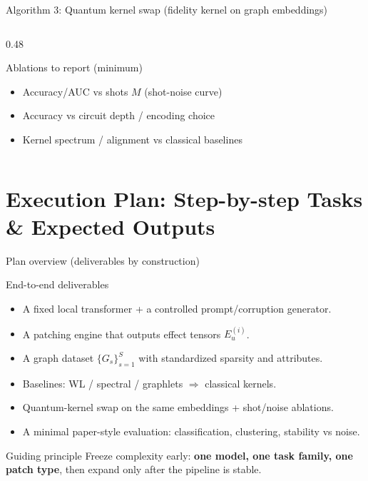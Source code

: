 \documentclass[aspectratio=169,xcolor={dvipsnames}]{beamer}
\renewcommand{\accent}[1]{\textbf{#1}}
\begin{document}
\begin{frame}[fragile, shrink=30]{Algorithm 3: Quantum kernel swap (fidelity kernel on graph embeddings)}
\begin{columns}[T,onlytextwidth]
\begin{column}{0.48\textwidth}
    \vspace{1mm}
    \begin{block}{Ablations to report (minimum)}
    \footnotesize
    \begin{itemize}\setlength\itemsep{2pt}
    \item Accuracy/AUC vs shots $M$ (shot-noise curve)
    \item Accuracy vs circuit depth / encoding choice
    \item Kernel spectrum / alignment vs classical baselines
    \end{itemize}
    \end{block}
    \end{column}
    \end{columns}
\end{frame}



\section{Execution Plan: Step-by-step Tasks \& Expected Outputs}

\begin{frame}[shrink=20]{Plan overview (deliverables by construction)}
\small
\begin{block}{End-to-end deliverables}
\begin{itemize}\setlength\itemsep{3pt}
\item A fixed local transformer + a controlled prompt/corruption generator.
\item A patching engine that outputs effect tensors $E_u^{(i)}$.
\item A graph dataset $\{G_s\}_{s=1}^S$ with standardized sparsity and attributes.
\item Baselines: WL / spectral / graphlets $\Rightarrow$ classical kernels.
\item Quantum-kernel swap on the same embeddings + shot/noise ablations.
\item A minimal paper-style evaluation: classification, clustering, stability vs noise.
\end{itemize}
\end{block}

\begin{block}{Guiding principle}
Freeze complexity early: \accent{one model, one task family, one patch type}, then expand only after the pipeline is stable.
\end{block}
\end{frame}
\end{document}
